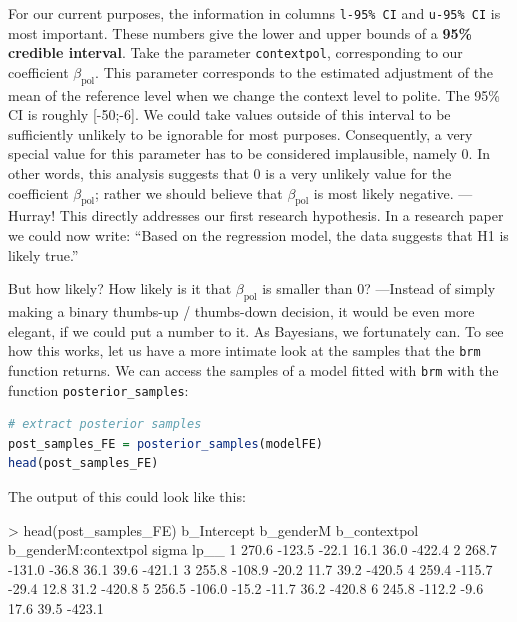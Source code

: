 \documentclass[nobib]{tufte-handout}
\begin{document}
For our current purposes, the information in  columns \texttt{l-95\% CI} and \texttt{u-95\% CI} is most important.
These numbers give the lower and upper bounds of a \textbf{95\% credible interval}.
Take the parameter \texttt{contextpol}, corresponding to our coefficient $\beta_{\text{pol}}$.
This parameter corresponds to the estimated adjustment of the mean of the reference level when we change the context level to polite.
The 95\% CI is roughly [-50;-6].
We could take values outside of this interval to be sufficiently unlikely to be ignorable for most purposes.
Consequently, a very special value for this parameter has to be considered implausible, namely 0.
In other words, this analysis suggests that 0 is a very unlikely value for the coefficient $\beta_{\text{pol}}$; rather we should believe that $\beta_{\text{pol}}$ is most likely negative. --- Hurray!
This directly addresses our first research hypothesis.
In a research paper we could now write: ``Based on the regression model, the data suggests that H1 is likely true.''

But how likely? How likely is it that $\beta_{\text{pol}}$ is smaller than 0? ---Instead of simply making a binary thumbs-up / thumbs-down decision, it would be even more elegant, if we could put a number to it. As Bayesians, we fortunately can. To see how this works, let us have a more intimate look at the samples that the \texttt{brm} function returns. We can access the samples of a model fitted with \texttt{brm} with the function \texttt{posterior\_samples}:

\bigskip

\begin{minipage}[]{\textwidth}
\begin{lstlisting}[language=R]
# extract posterior samples 
post_samples_FE = posterior_samples(modelFE)
head(post_samples_FE)
\end{lstlisting}
\end{minipage}

The output of this could look like this:

\bigskip

\begin{minipage}[]{1.2\textwidth}
\begin{rc}
> head(post_samples_FE)
  b_Intercept b_genderM b_contextpol b_genderM:contextpol sigma   lp__
1       270.6    -123.5        -22.1                 16.1  36.0 -422.4
2       268.7    -131.0        -36.8                 36.1  39.6 -421.1
3       255.8    -108.9        -20.2                 11.7  39.2 -420.5
4       259.4    -115.7        -29.4                 12.8  31.2 -420.8
5       256.5    -106.0        -15.2                -11.7  36.2 -420.8
6       245.8    -112.2         -9.6                 17.6  39.5 -423.1
\end{rc}
\end{minipage}
\end{document}
